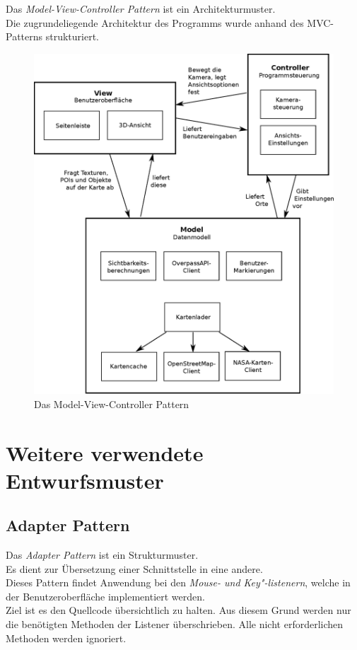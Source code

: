 \documentclass[10pt]{scrreprt}
\begin{document}
Das \textit{Model-View-Controller Pattern} ist ein Architekturmuster.\\ Die zugrundeliegende Architektur des Programms wurde anhand des MVC-Patterns strukturiert.\\
\begin{figure}[ht]
\begin{centering}
\includegraphics[scale=0.5]{ModelViewController.eps}
\caption{Das Model-View-Controller Pattern}
\end{centering}
\end{figure}

\newpage

\section{Weitere verwendete Entwurfsmuster}

\subsection{Adapter Pattern}
Das \textit{Adapter Pattern} ist ein Strukturmuster. \\
Es dient zur Übersetzung einer Schnittstelle in eine andere. \\ Dieses Pattern findet Anwendung bei den \textit{Mouse- und Key"-listenern}, welche in der Benutzeroberfläche implementiert werden. \\ Ziel ist es den Quellcode übersichtlich zu halten. Aus diesem Grund werden nur die benötigten Methoden der Listener überschrieben. Alle nicht erforderlichen Methoden werden ignoriert.
\end{document}

